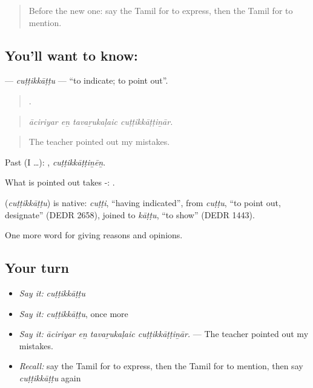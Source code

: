 \begin{quote}
Before the new one: say the Tamil for to express, then the Tamil for to mention.
\end{quote}

\subsection*{You'll want to know: }
\textbf{} — \emph{cuṭṭikkāṭṭu} — \textquotedblleft{}to indicate; to point out\textquotedblright{}.

\begin{quote}
   .
\end{quote}

\begin{quote}
\emph{āciriyar eṉ tavaṟukaḷaic cuṭṭikkāṭṭiṉār.}
\end{quote}

\begin{quote}
The teacher pointed out my mistakes.
\end{quote}

Past (I …): , \emph{cuṭṭikkāṭṭiṉēṉ}.

What is pointed out takes -:  .

\begin{cousinweb}
\textbf{} (\emph{cuṭṭikkāṭṭu}) is native: \emph{cuṭṭi}, \textquotedblleft{}having indicated\textquotedblright{}, from \emph{cuṭṭu}, \textquotedblleft{}to point out, designate\textquotedblright{} (DEDR 2658), joined to \emph{kāṭṭu}, \textquotedblleft{}to show\textquotedblright{} (DEDR 1443).
\end{cousinweb}

\begin{grammarlens}[title={What you've built}]
One more word for giving reasons and opinions.
\end{grammarlens}

\subsection*{Your turn}
\begin{itemize}
\raggedright
  \item \emph{Say it:} \emph{cuṭṭikkāṭṭu}
  \item \emph{Say it:} \emph{cuṭṭikkāṭṭu}, once more
  \item \emph{Say it:} \emph{āciriyar eṉ tavaṟukaḷaic cuṭṭikkāṭṭiṉār.} — The teacher pointed out my mistakes.
  \item \emph{Recall:} say the Tamil for to express, then the Tamil for to mention, then say \emph{cuṭṭikkāṭṭu} again
\end{itemize}

